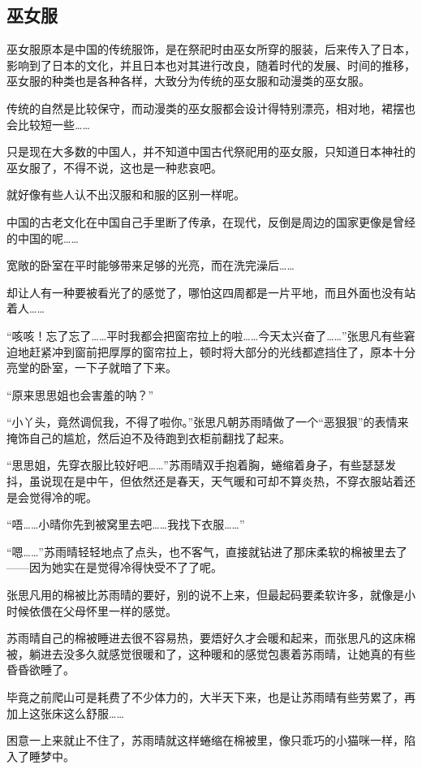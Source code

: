 \subsection{巫女服}

巫女服原本是中国的传统服饰，是在祭祀时由巫女所穿的服装，后来传入了日本，影响到了日本的文化，并且日本也对其进行改良，随着时代的发展、时间的推移，巫女服的种类也是各种各样，大致分为传统的巫女服和动漫类的巫女服。

传统的自然是比较保守，而动漫类的巫女服都会设计得特别漂亮，相对地，裙摆也会比较短一些……

只是现在大多数的中国人，并不知道中国古代祭祀用的巫女服，只知道日本神社的巫女服了，不得不说，这也是一种悲哀吧。

就好像有些人认不出汉服和和服的区别一样呢。

中国的古老文化在中国自己手里断了传承，在现代，反倒是周边的国家更像是曾经的中国的呢……

宽敞的卧室在平时能够带来足够的光亮，而在洗完澡后……

却让人有一种要被看光了的感觉了，哪怕这四周都是一片平地，而且外面也没有站着人……

“咳咳！忘了忘了……平时我都会把窗帘拉上的啦……今天太兴奋了……”张思凡有些窘迫地赶紧冲到窗前把厚厚的窗帘拉上，顿时将大部分的光线都遮挡住了，原本十分亮堂的卧室，一下子就暗了下来。

“原来思思姐也会害羞的呐？”

“小丫头，竟然调侃我，不得了啦你。”张思凡朝苏雨晴做了一个“恶狠狠”的表情来掩饰自己的尴尬，然后迫不及待跑到衣柜前翻找了起来。

“思思姐，先穿衣服比较好吧……”苏雨晴双手抱着胸，蜷缩着身子，有些瑟瑟发抖，虽说现在是中午，但依然还是春天，天气暖和可却不算炎热，不穿衣服站着还是会觉得冷的呢。

“唔……小晴你先到被窝里去吧……我找下衣服……”

“嗯……”苏雨晴轻轻地点了点头，也不客气，直接就钻进了那床柔软的棉被里去了——因为她实在是觉得冷得快受不了了呢。

张思凡用的棉被比苏雨晴的要好，别的说不上来，但最起码要柔软许多，就像是小时候依偎在父母怀里一样的感觉。

苏雨晴自己的棉被睡进去很不容易热，要焐好久才会暖和起来，而张思凡的这床棉被，躺进去没多久就感觉很暖和了，这种暖和的感觉包裹着苏雨晴，让她真的有些昏昏欲睡了。

毕竟之前爬山可是耗费了不少体力的，大半天下来，也是让苏雨晴有些劳累了，再加上这张床这么舒服……

困意一上来就止不住了，苏雨晴就这样蜷缩在棉被里，像只乖巧的小猫咪一样，陷入了睡梦中。

